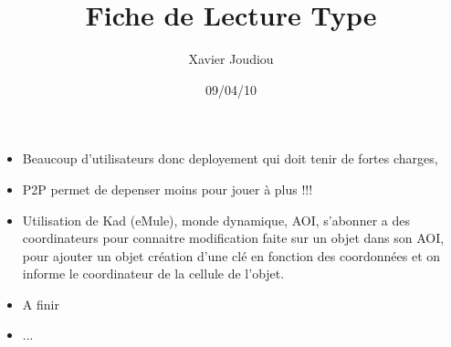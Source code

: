\documentclass[11pt,a4paper]{article}
\title{Fiche de Lecture Type}
\author{Xavier Joudiou}
\date{09/04/10}
\begin{document}
	
  \begin{itemize}
  \renewcommand{\labelitemi}{$\Rightarrow$}
	\item Beaucoup d'utilisateurs donc deployement qui doit tenir de fortes charges,
	\item P2P permet de depenser moins pour jouer à plus !!!
	\item Utilisation de Kad (eMule), monde dynamique, AOI, s'abonner a des coordinateurs pour connaitre modification faite sur un objet dans son AOI, pour ajouter un objet création d'une clé en fonction des coordonnées et on informe le coordinateur de la cellule de l'objet.
	\item A finir   
	\item ...
  \end{itemize}
\end{document}
